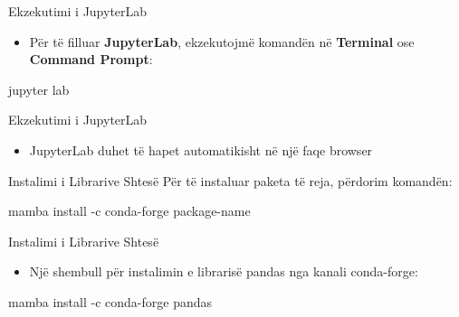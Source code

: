 \documentclass[
  ignorenonframetext,
]{beamer}
\newenvironment{Shaded}{\begin{snugshade}}{\end{snugshade}}
\newcommand{\NormalTok}[1]{#1}
\providecommand{\tightlist}{%
  \setlength{\itemsep}{0pt}\setlength{\parskip}{0pt}}
\begin{document}
\begin{frame}[fragile]{Ekzekutimi i JupyterLab}
\protect\hypertarget{ekzekutimi-i-jupyterlab}{}
\begin{itemize}
\tightlist
\item
  Për të filluar \textbf{JupyterLab}, ekzekutojmë komandën në
  \textbf{Terminal} ose \textbf{Command Prompt}:
\end{itemize}

\begin{Shaded}
\begin{Highlighting}[]
\NormalTok{jupyter lab}
\end{Highlighting}
\end{Shaded}
\end{frame}

\begin{frame}{Ekzekutimi i JupyterLab}
\protect\hypertarget{ekzekutimi-i-jupyterlab-1}{}
\begin{itemize}
\tightlist
\item
  JupyterLab duhet të hapet automatikisht në një faqe browser
\end{itemize}
\end{frame}

\begin{frame}[fragile]{Instalimi i Librarive Shtesë}
\protect\hypertarget{instalimi-i-librarive-shtesuxeb}{}
Për të instaluar paketa të reja, përdorim komandën:

\begin{Shaded}
\begin{Highlighting}[]
\NormalTok{mamba install {-}c conda{-}forge package{-}name}
\end{Highlighting}
\end{Shaded}
\end{frame}

\begin{frame}[fragile]{Instalimi i Librarive Shtesë}
\protect\hypertarget{instalimi-i-librarive-shtesuxeb-1}{}
\begin{itemize}
\tightlist
\item
  Një shembull për instalimin e librarisë pandas nga kanali conda-forge:
\end{itemize}

\begin{Shaded}
\begin{Highlighting}[]
\NormalTok{mamba install {-}c conda{-}forge pandas}
\end{Highlighting}
\end{Shaded}
\end{frame}
\end{document}

